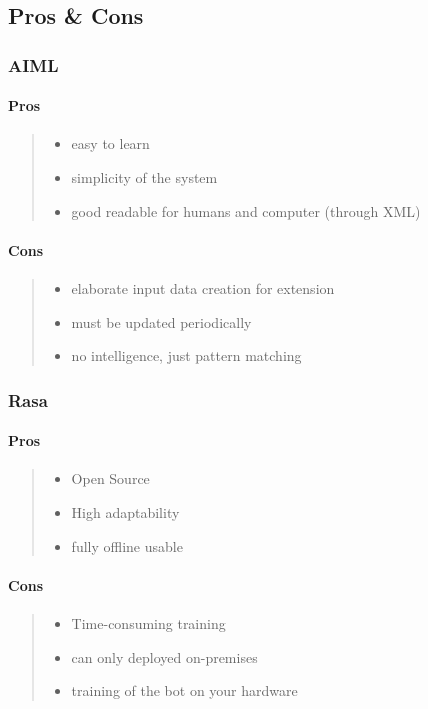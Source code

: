 \documentclass[10pt,final,journal,a4paper,oneside,twocolumn]{IEEEtran}
\begin{document}
\subsection{Pros \& Cons}

\subsubsection{AIML}
\paragraph{Pros}
\begin{quote}
\begin{itemize}
\item easy to learn
\item simplicity of the system
\item good readable for humans and computer (through XML)
\end{itemize}
\end{quote}
\paragraph{Cons}
\begin{quote}
\begin{itemize}
\item elaborate input data creation for extension
\item must be updated periodically
\item no intelligence, just pattern matching
\end{itemize}
\end{quote}

\subsubsection{Rasa}
\paragraph{Pros}
\begin{quote}
\begin{itemize}
\item Open Source
\item High adaptability
\item fully offline usable
\end{itemize}
\end{quote}
\paragraph{Cons}
\begin{quote}
\begin{itemize}
\item Time-consuming training
\item can only deployed on-premises
\item training of the bot on your hardware
\end{itemize}
\end{quote}
\end{document}
